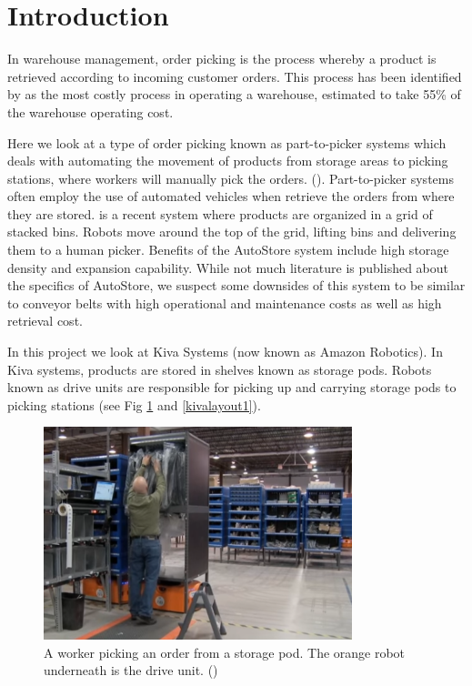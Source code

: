 \documentclass[a4paper,11pt]{article}
\begin{document}
\section{Introduction}
In warehouse management, order picking is the process whereby a product is retrieved according to incoming customer orders. This process has been identified by \cite{de2007design} as the most costly process in operating a warehouse, estimated to take 55\% of the warehouse operating cost.


Here we look at a type of order picking known as part-to-picker systems which deals with automating the movement of products from storage areas to picking stations, where workers will manually pick the orders. (\cite{wurman2008coordinating}). Part-to-picker systems often employ the use of automated vehicles when retrieve the orders from where they are stored. \cite{introduction2015autostore} is a recent system where products are organized in a grid of stacked bins. Robots move around the top of the grid, lifting bins and delivering them to a human picker. Benefits of the AutoStore system include high storage density and expansion capability. While not much literature is published about the specifics of AutoStore, we suspect some downsides of this system to be similar to conveyor belts with high operational and maintenance costs as well as high retrieval cost.

In this project we look at Kiva Systems (now known as Amazon Robotics). In Kiva systems, products are stored in shelves known as storage pods. Robots known as drive units are responsible for picking up and carrying storage pods to picking stations (see Fig \ref{kivaprocess} and \ref{kivalayout1}).
\begin{figure}[h!]
	\centering
	\includegraphics[width=0.8\textwidth ]{graphics/kivaprocess}
	\caption{A worker picking an order from a storage pod. The orange robot underneath is the drive unit. (\cite{kivayoutube2010quietlogistics})}
	\label{kivaprocess}
\end{figure}
\end{document}
